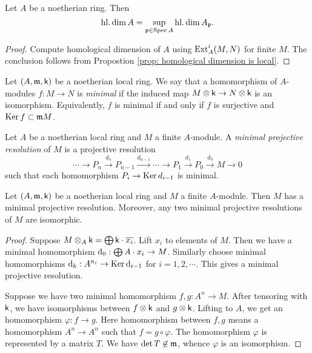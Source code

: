     \begin{proposition}\label{prop: homological dimension is local}
        Let \(A\) be a noetherian ring.
        Then 
        \[ \operatorname{hl.dim} A = \sup_{{\mathfrak{p}} \in \operatorname{Spec} A} \operatorname{hl.dim} A_{\mathfrak{p}}. \]
    \end{proposition}
    \begin{proof}
        Compute homological dimension of \(A\) using \(\operatorname{Ext}_A^i(M,N)\) for finite \(M\).
        The conclusion follows from Propostion \ref{prop: homological dimension is local}.
    \end{proof}

    \begin{definition}\label{def: minimal homomorphism}
        Let \((A,{\mathfrak{m}},{\mathsf{k}})\) be a noetherian local ring.
        We say that a homomorphism of \(A\)-modules \(f: M \to N\) is \emph{minimal} 
        if the induced map \(M \otimes {\mathsf{k}} \to N \otimes {\mathsf{k}}\) is an isomorphism.
        Equivalently, \(f\) is minimal if and only if \(f\) is surjective and \(\operatorname{Ker} f \subset {\mathfrak{m}} M\).
    \end{definition}

    \begin{definition}\label{def: minimal projective resolution}
        Let \(A\) be a noetherian local ring and \(M\) a finite \(A\)-module.
        A \emph{minimal projective resolution} of \(M\) is a projective resolution
        \[ \cdots \to P_n \xrightarrow{d_n} P_{n-1} \xrightarrow{d_{n-1}} \cdots \to P_1 \xrightarrow{d_1} P_0 \xrightarrow{d_0} M \to 0 \]
        such that each homomorphism \(P_i \to \operatorname{Ker} d_{i-1}\) is minimal.
    \end{definition}

    \begin{proposition}\label{prop: minimal projective resolution exists and unique}
        Let \((A,{\mathfrak{m}},{\mathsf{k}})\) be a noetherian local ring and \(M\) a finite \(A\)-module.
        Then \(M\) has a minimal projective resolution.
        Moreover, any two minimal projective resolutions of \(M\) are isomorphic.
    \end{proposition}
    \begin{proof}
        Suppose \(M\otimes_A {\mathsf{k}} = \bigoplus {\mathsf{k}} \cdot \overline{x_i} \).
        Lift \(x_i\) to elements of \(M\).
        Then we have a minimal homomorphism \({\mathrm{d}}_0: \bigoplus A \cdot x_i \to M\).
        Similarly choose minimal homomorphisms \( {\mathrm{d}}_k: A^{n_i} \to \operatorname{Ker} {\mathrm{d}}_{i-1} \) for \(i = 1,2,\cdots\).
        This gives a minimal projective resolution.

        Suppose we have two minimal homomorphism \(f,g: A^n \to M\).
        After tensoring with \({\mathsf{k}}\), we have isomorphisms between \(f\otimes {\mathsf{k}}\) and \(g\otimes {\mathsf{k}}\).
        Lifting to $A$, we get an homomorphism \(\varphi: f \to g\).
        Here homomorphism between \(f,g\) means a homomorphism \(A^n \to A^n\) such that \(f = g \circ \varphi\).
        The homomorphism \(\varphi\) is represented by a matrix \(T\).
        We have \(\det T \not\in {\mathfrak{m}}\), whence \(\varphi\) is an isomorphism.
    \end{proof}

